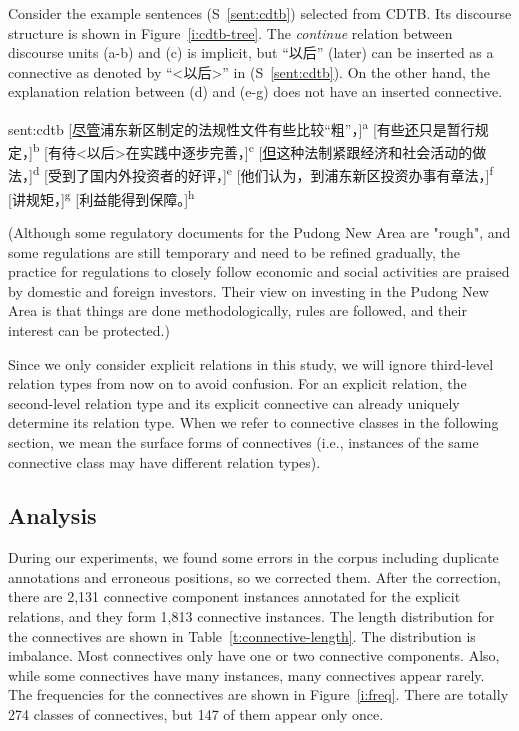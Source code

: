 Consider the example sentences (S~\ref{sent:cdtb}) selected from CDTB. Its discourse
structure is shown in Figure~\ref{i:cdtb-tree}. The \textit{continue} relation between
discourse units (a-b) and (c) is implicit, but ``以后'' (later) can be inserted
as a connective as denoted by ``<以后>'' in (S~\ref{sent:cdtb}).
On the other hand, the explanation relation between (d) and (e-g)
does not have an inserted connective.


\begin{sent}{sent:cdtb}{}
    [\underline{尽管}浦东新区制定的法规性文件有些比较``粗''，]\textsuperscript{a}
    [有些\underline{还}只是暂行规定，]\textsuperscript{b}
    [有待<以后>在实践中逐步完善，]\textsuperscript{c}
    [\underline{但}这种法制紧跟经济和社会活动的做法，]\textsuperscript{d}
    [受到了国内外投资者的好评，]\textsuperscript{e}
    [他们认为，到浦东新区投资办事有章法，]\textsuperscript{f}
    [讲规矩，]\textsuperscript{g}
    [利益能得到保障。]\textsuperscript{h}

    (Although some regulatory documents for the Pudong New Area are "rough",
    and some regulations are still temporary and
    need to be refined gradually,
    the practice for regulations to closely follow economic and social activities
    are praised by domestic and foreign investors.
    Their view on investing in the Pudong New Area is that
    things are done methodologically,
    rules are followed,
    and their interest can be protected.)
\end{sent}



Since we only consider explicit relations in this study, we will ignore
third-level relation types from now on to avoid confusion.
For an explicit relation, the second-level relation type and its explicit
connective can already uniquely determine its relation type.
When we refer to connective classes in the following section, we mean the
surface forms of connectives (i.e., instances of the same connective class
may have different relation types).

\subsection{Analysis}

During our experiments, we found some errors in the corpus including
duplicate annotations and erroneous positions, so we corrected
them. After the correction, there are 2,131 connective component instances
annotated for the explicit relations, and they form 1,813 connective instances.
The length distribution for the connectives are shown in Table~\ref{t:connective-length}.
The distribution is imbalance. Most connectives only have
one or two connective components. Also, while some connectives have many instances,
many connectives appear rarely. The frequencies for the connectives are shown
in Figure~\ref{i:freq}. There are totally 274 classes of connectives, but
147 of them appear only once.

